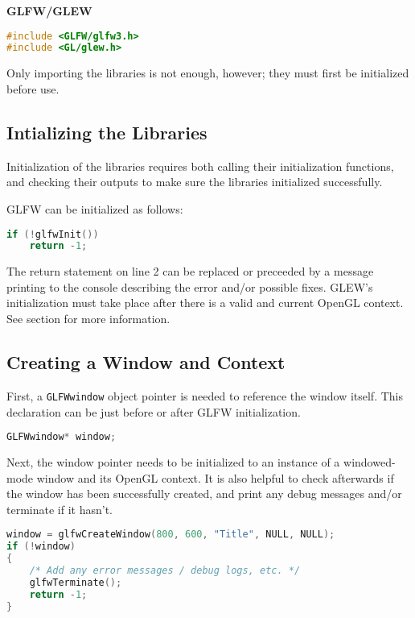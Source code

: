 \documentclass{article}
\newcommand{\ilcode}[1]{{\footnotesize\texttt{#1}}}
\begin{document}
\textbf{GLFW/GLEW}

\begin{lstlisting}[language=C++]
#include <GLFW/glfw3.h>
#include <GL/glew.h>
\end{lstlisting}

Only importing the libraries is not enough, however; they must first be initialized before use.

\subsection{Intializing the Libraries}

Initialization of the libraries requires both calling their initialization functions, and checking their outputs to make sure the libraries initialized successfully.

GLFW can be initialized as follows:
\begin{lstlisting}[language=C++]
if (!glfwInit())
    return -1;
\end{lstlisting}

The return statement on line 2 can be replaced or preceeded by a message printing to the console describing the error and/or possible fixes.
GLEW's initialization must take place after there is a valid and current OpenGL context. See section for more information.

\subsection{Creating a Window and Context}

First, a \ilcode{GLFWwindow} object pointer is needed to reference the window itself. This declaration can be just before or after GLFW initialization.

\begin{lstlisting}[language=C++]
GLFWwindow* window;
\end{lstlisting}

Next, the window pointer needs to be initialized to an instance of a windowed-mode window and its OpenGL context. It is also helpful to check afterwards if the window has been successfully created, and print any debug messages and/or terminate if it hasn't.

\begin{lstlisting}[language=C++]
window = glfwCreateWindow(800, 600, "Title", NULL, NULL);
if (!window)
{
    /* Add any error messages / debug logs, etc. */
    glfwTerminate();
    return -1;
}
\end{lstlisting}
\end{document}
